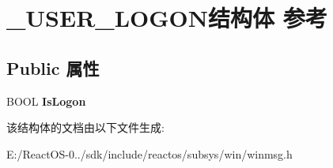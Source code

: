 \hypertarget{struct___u_s_e_r___l_o_g_o_n}{}\section{\+\_\+\+U\+S\+E\+R\+\_\+\+L\+O\+G\+O\+N结构体 参考}
\label{struct___u_s_e_r___l_o_g_o_n}
\subsection*{Public 属性}
\begin{DoxyCompactItemize}
\item 
\mbox{\label{struct___u_s_e_r___l_o_g_o_n_ac5b6a815b39465b9436cff2609380c1e}} 
B\+O\+OL {\bfseries Is\+Logon}
\end{DoxyCompactItemize}


该结构体的文档由以下文件生成\+:\begin{DoxyCompactItemize}
\item 
E\+:/\+React\+O\+S-\/0../sdk/include/reactos/subsys/win/winmsg.\+h\end{DoxyCompactItemize}
